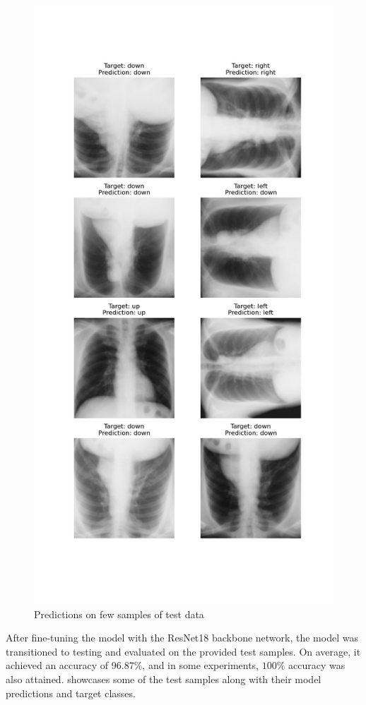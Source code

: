     \begin{figure}[!htbp]
        \centering
        \includegraphics[width=\linewidth]{../plots/orientation/2024-01-20 21:01:42.png}
        \caption{Predictions on few samples of test data}
        \label{fig:results}
    \end{figure} 

    After fine-tuning the model with the ResNet18 backbone network, the model was transitioned to testing and evaluated on the provided test samples. On average, it achieved an accuracy of $96.87\%$, and in some experiments, $100\%$ accuracy was also attained.  showcases some of the test samples along with their model predictions and target classes.
